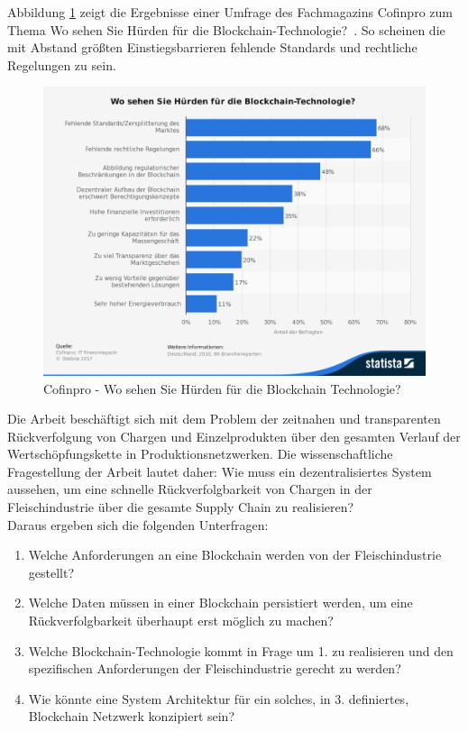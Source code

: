 
Abbildung \ref{fig:statista-huerden-blockchain-2016} zeigt die Ergebnisse einer Umfrage des Fachmagazins Cofinpro zum Thema \glqq Wo sehen Sie Hürden für die Blockchain-Technologie?\grqq~. So scheinen die mit Abstand größten Einstiegsbarrieren fehlende Standards und rechtliche Regelungen zu sein.

\begin{figure}[h!]
	\centering
	\includegraphics[width=0.7\linewidth]{pictures/Statista-Huerden-Blockchain-2016}
	\caption[Statista Blockchain Umfrage]{Cofinpro - Wo sehen Sie Hürden für die Blockchain Technologie? \citep{Cofinpro}}
	\label{fig:statista-huerden-blockchain-2016}
\end{figure}

Die Arbeit beschäftigt sich mit dem Problem der zeitnahen und transparenten Rückverfolgung von Chargen und Einzelprodukten über den gesamten Verlauf der Wertschöpfungskette in Produktionsnetzwerken. Die wissenschaftliche Fragestellung der Arbeit lautet daher: Wie muss ein dezentralisiertes System aussehen, um eine schnelle Rückverfolgbarkeit von Chargen in der Fleischindustrie über die gesamte Supply Chain zu realisieren?\\

Daraus ergeben sich die folgenden Unterfragen:

\begin{enumerate}
  \item Welche Anforderungen an eine Blockchain werden von der Fleischindustrie gestellt?
  \item Welche Daten müssen in einer Blockchain persistiert werden, um eine Rückverfolgbarkeit überhaupt erst möglich zu machen?
  \item Welche Blockchain-Technologie kommt in Frage um 1. zu realisieren und den spezifischen Anforderungen der Fleischindustrie gerecht zu werden?
  \item Wie könnte eine System Architektur für ein solches, in 3. definiertes, Blockchain Netzwerk konzipiert sein?
\end{enumerate}


\newpage
